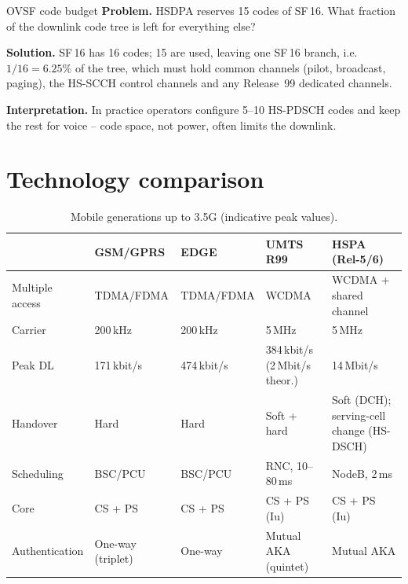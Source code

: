 \documentclass[11pt,a4paper]{article}
\begin{document}
\begin{examplebox}{OVSF code budget}\label{ex:ovsf}
\textbf{Problem.} HSDPA reserves 15 codes of SF\,16. What fraction of the downlink code tree is
left for everything else?

\textbf{Solution.} SF\,16 has 16 codes; 15 are used, leaving one SF\,16 branch, i.e.\ $1/16 =
6.25\%$ of the tree, which must hold common channels (pilot, broadcast, paging), the HS-SCCH
control channels and any Release~99 dedicated channels.

\textbf{Interpretation.} In practice operators configure 5--10 HS-PDSCH codes and keep the rest
for voice -- code space, not power, often limits the downlink.
\end{examplebox}

\section{Technology comparison}
\begin{table}[htbp]
\centering\small
\caption{Mobile generations up to 3.5G (indicative peak values).}\label{tab:gen}
\begin{tabularx}{\linewidth}{@{}l Y Y Y Y@{}}
\toprule
{} & GSM/GPRS & EDGE & UMTS R99 & HSPA (Rel-5/6) \\
\midrule
Multiple access   & TDMA/FDMA       & TDMA/FDMA         & WCDMA            & WCDMA + shared channel \\
Carrier           & 200\,kHz        & 200\,kHz          & 5\,MHz           & 5\,MHz \\
Peak DL           & 171\,kbit/s     & 474\,kbit/s       & 384\,kbit/s (2\,Mbit/s theor.) & 14\,Mbit/s \\
Handover          & Hard            & Hard              & Soft + hard      & Soft (DCH); serving-cell change (HS-DSCH) \\
Scheduling        & BSC/PCU         & BSC/PCU           & RNC, 10--80\,ms  & NodeB, 2\,ms \\
Core              & CS + PS         & CS + PS           & CS + PS (Iu)     & CS + PS (Iu) \\
Authentication    & One-way (triplet) & One-way         & Mutual AKA (quintet) & Mutual AKA \\
\bottomrule
\end{tabularx}
\end{table}
\end{document}
